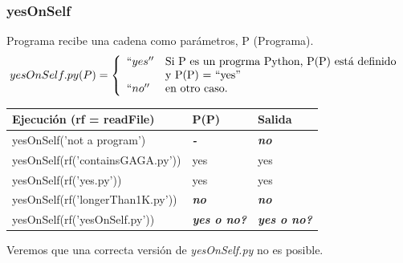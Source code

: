 \documentclass[xcolor=table]{beamer}
\begin{document}


\begin{frame}  \frametitle{yesOnSelf}  \footnotesize  

Programa recibe una cadena como parámetros,  P (Programa). 
\begin{equation}
     \label{eq:yesOnSelf}
     yesOnSelf.py (P) =  \left\{
	       \begin{array}{ll}
		 ``yes''      & \text{Si P es un progrma Python, P(P) está definido } \\
                     &   \text{y P(P) = ``yes''} \\
		``no''       & \text{en otro caso.} \\
	       \end{array}
	     \right.
   \end{equation}


    \begin{table}[]
    \begin{tabular}{|l|l|l|}
    \hline
    \rowcolor[HTML]{EFEFEF} 
    {\color[HTML]{000000} \textbf{Ejecución (rf = readFile)}} & {\color[HTML]{000000} \textbf{P(P)}}   & {\color[HTML]{000000} \textbf{Salida}}             \\ \hline\hline
    yesOnSelf('not a program')           & \color[HTML]{FE0000} \textit{\textbf{-}}             & \color[HTML]{FE0000} \textit{\textbf{no}}  \\ \hline\hline
    yesOnSelf(rf('containsGAGA.py'))     & yes        & yes \\ \hline\hline
    yesOnSelf(rf('yes.py'))                & yes           & yes \\ \hline\hline
    yesOnSelf(rf('longerThan1K.py')) & \color[HTML]{FE0000} \textit{\textbf{no}} & \color[HTML]{FE0000} \textit{\textbf{no}} \\ \hline\hline
    yesOnSelf(rf('yesOnSelf.py'))  & \color[HTML]{FE0000} \textit{\textbf{yes o no?}}  & \color[HTML]{FE0000} \textit{\textbf{yes o no?}}  \\ \hline
    \end{tabular}
\end{table}

\begin{center}

    Veremos que una correcta versión de \textit{yesOnSelf.py} no es posible.
\end{center}
\end{frame} 
\end{document}
